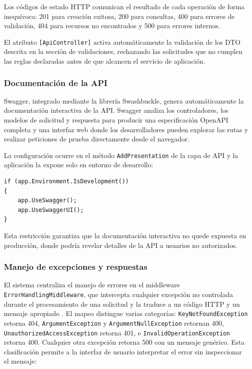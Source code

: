 Los códigos de estado HTTP comunican el resultado de cada operación de forma inequívoca: 201 para creación exitosa, 200 para consultas, 400 para errores de validación, 404 para recursos no encontrados y 500 para errores internos. 

El atributo \texttt{[ApiController]} activa automáticamente la validación de los DTO descrita en la sección de validaciones, rechazando las solicitudes que no cumplen las reglas declaradas antes de que alcancen el servicio de aplicación.

\subsubsection{Documentación de la API}

Swagger, integrado mediante la librería Swashbuckle, genera automáticamente la documentación interactiva de la API.
Swagger analiza los controladores, los modelos de solicitud y respuesta para producir una especificación OpenAPI completa y una interfaz web donde los desarrolladores pueden explorar las rutas y realizar peticiones de prueba directamente desde el navegador.

La configuración ocurre en el método \texttt{AddPresentation} de la capa de API y la aplicación la expone solo en entorno de desarrollo:

\begin{lstlisting}[language={[Sharp]C}, caption={Configuración de Swagger en la aplicación}, label={lst:swagger}]
if (app.Environment.IsDevelopment())
{
    app.UseSwagger();
    app.UseSwaggerUI();
}
\end{lstlisting}

Esta restricción garantiza que la documentación interactiva no quede expuesta en producción, donde podría revelar detalles de la API a usuarios no autorizados.



\subsubsection{Manejo de excepciones y respuestas}

El sistema centraliza el manejo de errores en el middleware \texttt{ErrorHandlingMiddleware}, que intercepta cualquier excepción no controlada durante el procesamiento de una solicitud y la traduce a un código HTTP y un mensaje apropiado \cite{microsoft_error_handling}. El mapeo distingue varias categorías: \texttt{KeyNotFoundException} retorna 404, \texttt{ArgumentException} y \texttt{ArgumentNullException} retornan 400, \texttt{UnauthorizedAccessException} retorna 401, e \texttt{InvalidOperationException} retorna 400. Cualquier otra excepción retorna 500 con un mensaje genérico. Esta clasificación permite a la interfaz de usuario interpretar el error sin inspeccionar el mensaje:

